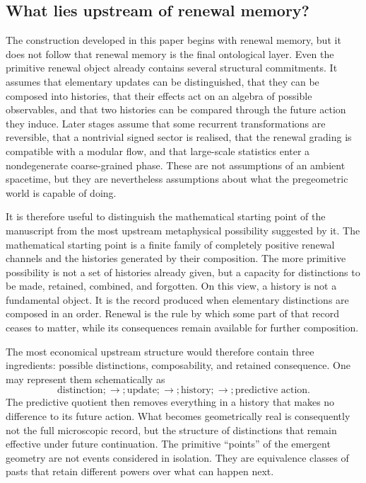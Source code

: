 \documentclass[11pt]{article}
\theoremstyle{definition}
\theoremstyle{remark}
\begin{document}
\subsection{What lies upstream of renewal memory?}
\label{subsec:upstream-ontology}

The construction developed in this paper begins with renewal memory, but it
does not follow that renewal memory is the final ontological layer.  Even the
primitive renewal object already contains several structural commitments.  It
assumes that elementary updates can be distinguished, that they can be
composed into histories, that their effects act on an algebra of possible
observables, and that two histories can be compared through the future action
they induce.  Later stages assume that some recurrent transformations are
reversible, that a nontrivial signed sector is realised, that the renewal
grading is compatible with a modular flow, and that large-scale statistics
enter a nondegenerate coarse-grained phase.  These are not assumptions of an
ambient spacetime, but they are nevertheless assumptions about what the
pregeometric world is capable of doing.

It is therefore useful to distinguish the mathematical starting point of the
manuscript from the most upstream metaphysical possibility suggested by it.
The mathematical starting point is a finite family of completely positive
renewal channels and the histories generated by their composition.  The more
primitive possibility is not a set of histories already given, but a capacity
for distinctions to be made, retained, combined, and forgotten.  On this
view, a history is not a fundamental object.  It is the record produced when
elementary distinctions are composed in an order.  Renewal is the rule by
which some part of that record ceases to matter, while its consequences remain
available for further composition.

The most economical upstream structure would therefore contain three
ingredients: possible distinctions, composability, and retained consequence.
One may represent them schematically as
\[
    \text{distinction}
    ;\longrightarrow;
    \text{update}
    ;\longrightarrow;
    \text{history}
    ;\longrightarrow;
    \text{predictive action}.
\]
The predictive quotient then removes everything in a history that makes no
difference to its future action.  What becomes geometrically real is consequently not the full microscopic
record, but the structure of distinctions that remain effective under future
continuation.  The primitive ``points'' of the emergent geometry are not
events considered in isolation.  They are equivalence classes of pasts that
retain different powers over what can happen next.
\end{document}
